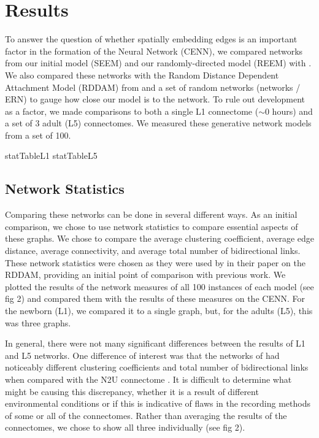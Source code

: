 \section{Results}

To answer the question of whether spatially embedding edges is an important factor in the formation of the \ce Neural Network (CENN), we compared networks from our initial model (SEEM) and our randomly-directed model (REEM) with \ce. 
We also compared these networks with the Random Distance Dependent Attachment Model (RDDAM) from \cite{Itzhack} and a set of random networks (\er networks / ERN) to gauge how close our model is to the \ce network. 
To rule out development as a factor, we made comparisons to both a single L1 connectome ($\sim 0$ hours) and a set of 3 adult (L5) connectomes. 
We measured these generative network models from a set of 100.

{statTableL1}
{statTableL5}  

\subsection{Network Statistics}
Comparing these networks can be done in several different ways. As an initial comparison, we chose to use network statistics to compare essential aspects of these graphs. We chose to compare the average clustering coefficient, average edge distance, average connectivity, and average total number of bidirectional links. These network statistics were chosen as they were used by \cite{Itzhack} in their paper on the RDDAM, providing an initial point of comparison with previous work. We plotted the results of the network measures of all 100 instances of each model (see fig 2) and compared them with the results of these measures on the CENN. For the newborn (L1), we compared it to a single graph, but, for the adults (L5), this was three graphs.

In general, there were not many significant differences between the results of L1 and L5 networks. One difference of interest was that the networks of \cite{Witvliet} had noticeably different clustering coefficients and total number of bidirectional links when compared with the N2U connectome \citep{Durbin}.
It is difficult to determine what might be causing this discrepancy, whether it is a result of different environmental conditions or if this is indicative of flaws in the recording methods of some or all of the connectomes. Rather than averaging the results of the connectomes, we chose to show all three individually (see fig 2). 

